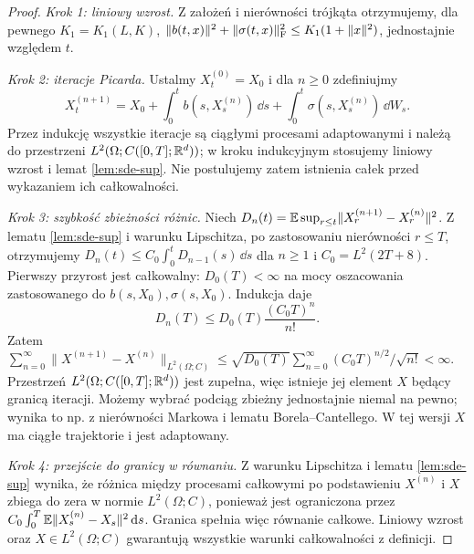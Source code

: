 \begin{proof}
\emph{Krok 1: liniowy wzrost.} Z założeń i nierówności
trójkąta otrzymujemy, dla pewnego $K_1=K_1(L,K)$,
$\lVert b(t,x)\rVert^2+\lVert \sigma(t,x)\rVert_{\mathrm F}^2
\le K_1(1+\lVert x\rVert^2)$, jednostajnie względem $t$.

\emph{Krok 2: iteracje Picarda.} Ustalmy $X^{(0)}_t=X_0$
i dla $n\ge0$ zdefiniujmy
\[
X_t^{(n+1)}=X_0+\int_0^tb(s,X_s^{(n)})\,\dd s
+\int_0^t\sigma(s,X_s^{(n)})\,\dd W_s.
\tag{5.4}\label{eq:sde-picard}
\]
Przez indukcję wszystkie iteracje są ciągłymi procesami
adaptowanymi i należą do przestrzeni
$L^2(\Omega;C([0,T];\mathbb{R}^d))$; w kroku indukcyjnym
stosujemy liniowy wzrost i lemat \ref{lem:sde-sup}.
Nie postulujemy zatem istnienia całek przed wykazaniem
ich całkowalności.

\emph{Krok 3: szybkość zbieżności różnic.}
Niech $D_n(t)=\mathbb{E}\sup_{r\le t}
\lVert X_r^{(n+1)}-X_r^{(n)}\rVert^2$.
Z lematu \ref{lem:sde-sup} i warunku Lipschitza,
po zastosowaniu nierówności $r\le T$, otrzymujemy
$D_n(t)\le C_0\int_0^t D_{n-1}(s)\,\dd s$
dla $n\ge1$ i $C_0=L^2(2T+8)$.
Pierwszy przyrost jest całkowalny:
$D_0(T)<\infty$ na mocy oszacowania zastosowanego
do $b(s,X_0),\sigma(s,X_0)$. Indukcja daje
\[
D_n(T)\le D_0(T)\frac{(C_0T)^n}{n!}.
\tag{5.5}\label{eq:picard-factorial}
\]
Zatem
$\sum_{n=0}^\infty\|X^{(n+1)}-X^{(n)}\|_{L^2(\Omega;C)}
\le\sqrt{D_0(T)}\sum_{n=0}^\infty(C_0T)^{n/2}/\sqrt{n!}<\infty$.
Przestrzeń $L^2(\Omega;C([0,T];\mathbb{R}^d))$ jest zupełna,
więc istnieje jej element $X$ będący granicą iteracji.
Możemy wybrać podciąg zbieżny jednostajnie niemal
na pewno; wynika to np. z nierówności Markowa i
lematu Borela--Cantellego. W tej wersji $X$ ma
ciągłe trajektorie i jest adaptowany.

\emph{Krok 4: przejście do granicy w równaniu.}
Z warunku Lipschitza i lematu \ref{lem:sde-sup}
wynika, że różnica między procesami całkowymi po
podstawieniu $X^{(n)}$ i $X$ zbiega do zera
w normie $L^2(\Omega;C)$, ponieważ jest ograniczona
przez $C_0\int_0^T\mathbb{E}\lVert X_s^{(n)}-X_s\rVert^2\,\mathrm{d} s$.
Granica spełnia więc równanie całkowe. Liniowy
wzrost oraz $X\in L^2(\Omega;C)$ gwarantują
wszystkie warunki całkowalności z definicji.


\end{proof}
